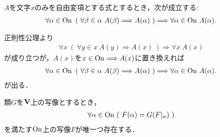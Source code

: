 	\begin{screen}
		\begin{thm}[超限帰納法]
			$A$を文字$x$のみを自由変項とする式とするとき，次が成立する:
			\begin{align}
				\forall \alpha \in \ON\ 
				\left(\ \forall \beta \in \alpha\ A(\beta)
				\Longrightarrow A(\alpha)\ \right)
				\Longrightarrow \forall \alpha \in \ON\ A(\alpha).
			\end{align}
		\end{thm}
	\end{screen}
	
	\begin{prf}
		正則性公理より
		\begin{align}
			\forall x\ \left(\ \forall y \in x\ A(y)
			\Longrightarrow A(x)\ \right)
			\Longrightarrow \forall x\ A(x)
		\end{align}
		が成り立つが，$A(x)$を$x \in \mathrm{On} \Longrightarrow A(x)$に置き換えれば
		\begin{align}
			\forall \alpha \in \ON\ 
			\left(\ \forall \beta \in \alpha\ A(\beta)
			\Longrightarrow A(\alpha)\ \right)
			\Longrightarrow \forall \alpha \in \ON\ A(\alpha).
		\end{align}
		が出る．
		\QED
	\end{prf}
	
	\begin{screen}
		\begin{thm}[超限帰納法による写像の構成]\label{thm:transfinite_recursion_theorem}
			類$G$を$\mathbf{V}$上の写像とするとき，
			\begin{align}
				\forall \alpha \in \mathrm{On}\ (\ F(\alpha) = G(F|_\alpha)\ )
			\end{align}
			を満たす$\mathrm{On}$上の写像$F$が唯一つ存在する．
		\end{thm}
	\end{screen}
	
